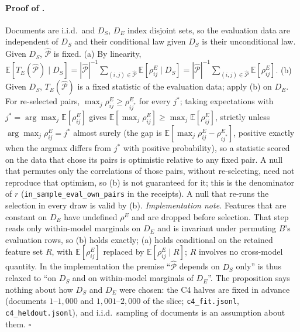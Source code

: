 \paragraph{Proof of .} Documents are i.i.d.\ and $D_S$, $D_E$ index disjoint
sets, so the evaluation data are independent of $D_S$ and their conditional law given $D_S$ is
their unconditional law. Given $D_S$, $\widehat{\mathcal{P}}$ is fixed. (a) By linearity,
$\mathbb{E}[T_E(\widehat{\mathcal{P}})\mid D_S]=|\widehat{\mathcal{P}}|^{-1}
\sum_{(i,j)\in\widehat{\mathcal{P}}}\mathbb{E}[\rho^E_{ij}\mid D_S]
=|\widehat{\mathcal{P}}|^{-1}\sum_{(i,j)\in\widehat{\mathcal{P}}}\mathbb{E}[\rho^E_{ij}]$.
(b) Given $D_S$, $T_E(\widehat{\mathcal{P}})$ is a fixed statistic of the evaluation data;
apply (b) on $D_E$. For re-selected pairs, $\max_j\rho^E_{ij}\ge\rho^E_{ij^\ast}$
for every $j^\ast$; taking expectations with $j^\ast=\arg\max_j\mathbb{E}[\rho^E_{ij}]$ gives
$\mathbb{E}[\max_j\rho^E_{ij}]\ge\max_j\mathbb{E}[\rho^E_{ij}]$, strictly unless
$\arg\max_j\rho^E_{ij}=j^\ast$ almost surely (the gap is
$\mathbb{E}[\max_j\rho^E_{ij}-\rho^E_{ij^\ast}]$, positive exactly when the argmax differs from $j^\ast$
with positive probability), so a statistic scored on the
data that chose its pairs is optimistic relative to any fixed pair. A null that permutes only
the correlations of those pairs, without re-selecting, need not reproduce that optimism, so (b)
is not guaranteed for it; this is the denominator of $r$ (\texttt{in\_sample\_eval\_own\_pairs} in the
receipts). A null that re-runs the selection in every draw is valid by (b).
\emph{Implementation
note.} Features that are constant on $D_E$ have undefined $\rho^E$ and are dropped before
selection. That step reads only within-model marginals on $D_E$ and is invariant under permuting
$B$'s evaluation rows, so (b) holds exactly; (a) holds conditional on the retained feature set $R$, with
$\mathbb{E}[\rho^E_{ij}]$ replaced by $\mathbb{E}[\rho^E_{ij}\mid R]$; $R$ involves no cross-model
quantity. In the implementation the premise ``$\widehat{\mathcal{P}}$ depends on $D_S$ only'' is thus
relaxed to ``on $D_S$ and on within-model marginals of $D_E$''. The proposition says nothing about how $D_S$ and
$D_E$ were chosen: the C4 halves are fixed in advance (documents $1$--$1{,}000$
and $1{,}001$--$2{,}000$ of the slice; \texttt{c4\_fit.jsonl}, \texttt{c4\_heldout.jsonl}), and i.i.d.\ sampling of documents is an assumption about them.
\hfill$\square$

